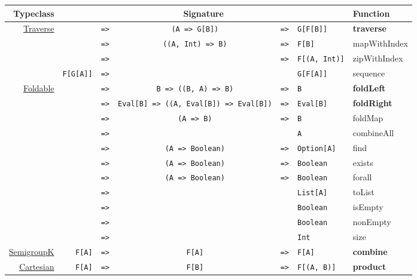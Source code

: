 \documentclass{tufte-handout}
\newcommand{\fa}{F[A]}
\newcommand{\fb}{F[B]}
\newcommand{\rarr}{\texttt{=>}}
\newcommand{\fTwo}[2]{\texttt{#1} & \rarr & & & \texttt{#2}}
\newcommand{\fThree}[3]{\texttt{#1} & \rarr & \texttt{#2} & \rarr & \texttt{#3}}
\newcommand{\sdocUrl}[1]{https://typelevel.org/cats/api/cats/#1.html}
\newcommand{\sdocHref}[1]{\href{\sdocUrl{#1}}{#1}}
\begin{document}

\begin{table}[ht]
  \centering
  \selectfont
  \begin{tabular}{rrcclll}
    Typeclass & \multicolumn{5}{c}{Signature} & Function \\
    \midrule

    \multirow{4}{*}{\sdocHref{Traverse}}
      & \fThree{\multirow{3}{*}{\fa}}{(A => G[B])}{G[F[B]]} & \textbf{traverse} \\
      & \fThree{}{((A, Int) => B)}{\fb} & mapWithIndex \\
      & \fThree{}{}{F[(A, Int)]} & zipWithIndex \\
      & \fTwo{F[G[A]]}{G[F[A]]} & sequence \\[.5cm]

    \multirow{11}{*}{\sdocHref{Foldable}}
      & \fThree{\multirow{11}{*}{\fa}}{B => ((B, A) => B)}{B} & \textbf{foldLeft} \\
      & \fThree{}{Eval[B] => ((A, Eval[B]) => Eval[B])}{Eval[B]} & \textbf{foldRight} \\
      & \fThree{}{(A => B)}{B} & foldMap\footnotemark \\
      & \fTwo{}{A} & combineAll\footnotemark \\
      & \fThree{}{(A => Boolean)}{Option[A]} & find \\
      & \fThree{}{(A => Boolean)}{Boolean} & exists \\
      & \fThree{}{(A => Boolean)}{Boolean} & forall \\
      & \fTwo{}{List[A]} & toList \\
      & \fTwo{}{Boolean} & isEmpty \\
      & \fTwo{}{Boolean} & nonEmpty \\
      & \fTwo{}{Int} & size \\[.5cm]

    \sdocHref{SemigroupK}
      & \fThree{\fa}{\fa}{\fa} & \textbf{combine} \\[.5cm]

    \sdocHref{Cartesian}
      & \fThree{\fa}{\fb}{F[(A, B)]} & \textbf{product} \\[.5cm]

  \end{tabular}
\end{table}
\end{document}
